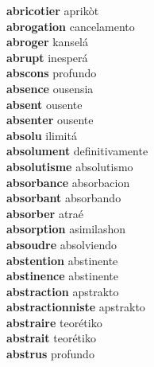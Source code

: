 \textbf{abricotier } aprikòt \\
\textbf{abrogation } cancelamento \\
\textbf{abroger } kanselá \\
\textbf{abrupt } inesperá \\
\textbf{abscons } profundo \\
\textbf{absence } ousensia \\
\textbf{absent } ousente \\
\textbf{absenter } ousente \\
\textbf{absolu } ilimitá \\
\textbf{absolument } definitivamente \\
\textbf{absolutisme } absolutismo \\
\textbf{absorbance } absorbacion \\
\textbf{absorbant } absorbando \\
\textbf{absorber } atraé \\
\textbf{absorption } asimilashon \\
\textbf{absoudre } absolviendo \\
\textbf{abstention } abstinente \\
\textbf{abstinence } abstinente \\
\textbf{abstraction } apstrakto \\
\textbf{abstractionniste } apstrakto \\
\textbf{abstraire } teorétiko \\
\textbf{abstrait } teorétiko \\
\textbf{abstrus } profundo \\
